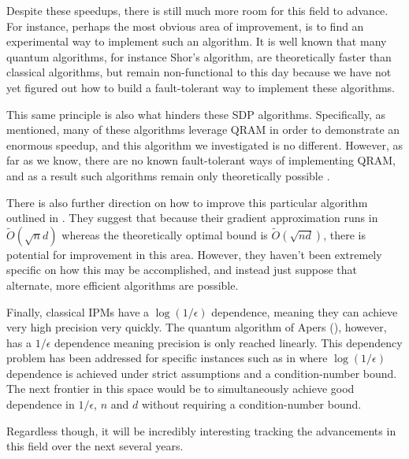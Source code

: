 \documentclass[11pt]{article}
\begin{document}
Despite these speedups, there is still much more room for this field to advance. For instance, perhaps the most obvious area of improvement, is to find an experimental way to implement such an algorithm. It is well known that many quantum algorithms, for instance Shor's algorithm, are theoretically faster than classical algorithms, but remain non-functional to this day because we have not yet figured out how to build a fault-tolerant way to implement these algorithms. 

This same principle is also what hinders these SDP algorithms. Specifically, as mentioned, many of these algorithms leverage 
QRAM in order to demonstrate an enormous speedup, and this algorithm we investigated is no different. However, as far as we know, there are no known fault-tolerant ways of implementing QRAM, and as a result such algorithms remain only theoretically possible \cite{abbasQuantumOptimizationPotential2023}. 



There is also further direction on how to improve this particular algorithm outlined in \cite{apersQuantumSpeedupsLinear2024}. They suggest that because their gradient approximation runs in \( \widetilde O(\sqrt{n} d) \) whereas the theoretically 
optimal bound is \( \widetilde O(\sqrt{nd}) \), there is potential for improvement in this area. However, they haven't been extremely specific on how this may be accomplished, and instead just suppose that alternate, more efficient algorithms are possible. 

Finally, classical IPMs have a $\log(1/\epsilon)$ dependence, meaning they can achieve very high precision very quickly. The quantum algorithm of Apers (\cite{apersQuantumSpeedupsLinear2024}), however, has a $1/\epsilon$ dependence meaning precision is only reached linearly. This dependency problem has been addressed for specific instances such as in \cite{huangFasterQuantumAlgorithm2023} where $\log(1/\epsilon)$ dependence is achieved under strict assumptions and a condition-number bound. The next frontier in this space would be to simultaneously achieve good dependence in $1/\epsilon$, $n$ and $d$ without requiring a condition-number bound.

Regardless though, it will be incredibly interesting tracking the advancements in this field over the next several years.


%
%
\pagebreak
\nocite{*}
\printbibliography
\end{document}
